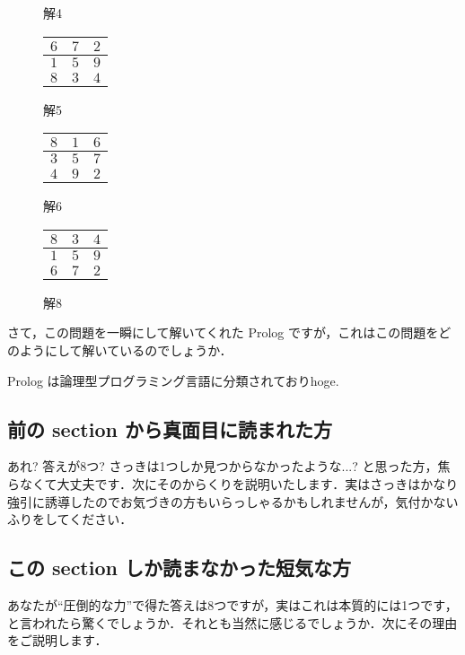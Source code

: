 \documentclass[11pt]{jsarticle}
\begin{document}
\begin{figure}[htbp]
\begin{minipage}{0.24\hsize}
\begin{tabular}{|c|c|c|}
    \end{tabular}
    \caption{解4}
    \label{}
  \end{minipage}
  \begin{minipage}{0.24\hsize}
    \centering
    \begin{tabular}{|c|c|c|}
      \hline
      $6$ & $7$ & $2$ \\ \hline
      $1$ & $5$ & $9$ \\ \hline
      $8$ & $3$ & $4$ \\ \hline
    \end{tabular}
    \caption{解5}
    \label{}
  \end{minipage}
  \begin{minipage}{0.24\hsize}
    \centering
    \begin{tabular}{|c|c|c|}
      \hline
      $8$ & $1$ & $6$ \\ \hline
      $3$ & $5$ & $7$ \\ \hline
      $4$ & $9$ & $2$ \\ \hline
    \end{tabular}
    \caption{解6}
    \label{}
  \end{minipage}
  \begin{minipage}{0.24\hsize}
    \centering
    \begin{tabular}{|c|c|c|}
      \hline
      $8$ & $3$ & $4$ \\ \hline
      $1$ & $5$ & $9$ \\ \hline
      $6$ & $7$ & $2$ \\ \hline
    \end{tabular}
    \caption{解8}
    \label{ans}
  \end{minipage}
\end{figure}

さて，この問題を一瞬にして解いてくれた Prolog ですが，これはこの問題をどのようにして解いているのでしょうか．

Prolog は論理型プログラミング言語に分類されておりhoge.

\subsection{前の section から真面目に読まれた方}
あれ? 答えが8つ? さっきは1つしか見つからなかったような...? と思った方，焦らなくて大丈夫です．次にそのからくりを説明いたします．実はさっきはかなり強引に誘導したのでお気づきの方もいらっしゃるかもしれませんが，気付かないふりをしてください．

\subsection{この section しか読まなかった短気な方}
あなたが``圧倒的な力''で得た答えは8つですが，実はこれは本質的には1つです，と言われたら驚くでしょうか．それとも当然に感じるでしょうか．次にその理由をご説明します．
\end{document}
